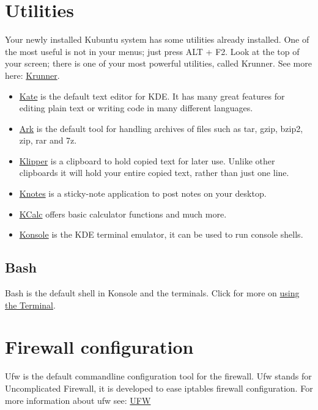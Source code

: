\documentclass[letterpaper,10pt,english]{sphinxmanual}
\begin{document}
\section{Utilities}
\label{docs/software:utilities}
Your newly installed Kubuntu system has some utilities already installed. One of the most useful is not in your menus; just press ALT + F2. Look at the top of your screen; there is one of your most powerful utilities, called Krunner. See more here: \href{https://userbase.kde.org/Special:MyLanguage/Plasma/Krunner}{Krunner}.
\begin{itemize}
\item {} 
\href{https://userbase.kde.org/Special:MyLanguage/Kate}{Kate} is the default text editor for KDE. It has many great features for editing plain text or writing code in many different languages.

\item {} 
\href{https://userbase.kde.org/Special:MyLanguage/Ark}{Ark} is the default tool for handling archives of files such as tar, gzip, bzip2, zip, rar and 7z.

\item {} 
\href{https://userbase.kde.org/Special:MyLanguage/Klipper}{Klipper} is a clipboard to hold copied text for later use. Unlike other clipboards it will hold your entire copied text, rather than just one line.

\item {} 
\href{https://userbase.kde.org/Special:MyLanguage/KNotes}{Knotes} is a sticky-note application to post notes on your desktop.

\item {} 
\href{https://userbase.kde.org/Special:MyLanguage/KCalc}{KCalc} offers basic calculator functions and much more.

\item {} 
\href{https://userbase.kde.org/Special:MyLanguage/Konsole}{Konsole} is the KDE terminal emulator, it can be used to run console shells.

\end{itemize}


\subsection{Bash}
\label{docs/software:bash}
Bash is the default shell in Konsole and the terminals. Click for more on \href{https://help.ubuntu.com/community/UsingTheTerminal}{using the Terminal}.


\section{Firewall configuration}
\label{docs/software:firewall-configuration}
Ufw is the default commandline configuration tool for the firewall. Ufw stands for Uncomplicated Firewall, it is developed to ease iptables firewall configuration. For more information about ufw see: \href{https://help.ubuntu.com/community/UFW}{UFW}
\end{document}
